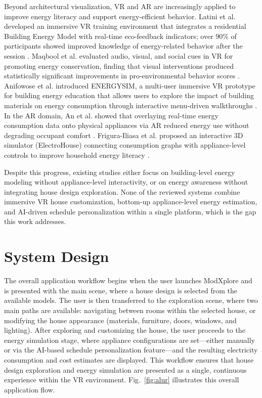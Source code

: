 \documentclass[conference]{IEEEtran}
\begin{document}
Beyond architectural visualization, VR and AR are increasingly applied to improve energy literacy and support energy-efficient behavior. Latini et al. developed an immersive VR training environment that integrates a residential Building Energy Model with real-time eco-feedback indicators; over 90\% of participants showed improved knowledge of energy-related behavior after the session \cite{EnergyAwarenessVR2025}. Maqbool et al. evaluated audio, visual, and social cues in VR for promoting energy conservation, finding that visual interventions produced statistically significant improvements in pro-environmental behavior scores \cite{maqbool2025vr}. Anifowose et al. introduced ENERGYSIM, a multi-user immersive VR prototype for building energy education that allows users to explore the impact of building materials on energy consumption through interactive menu-driven walkthroughs \cite{EnergySIM2023}. In the AR domain, An et al. showed that overlaying real-time energy consumption data onto physical appliances via AR reduced energy use without degrading occupant comfort \cite{AREnergy2023}. Frigura-Iliasa et al. proposed an interactive 3D simulator (ElectroHouse) connecting consumption graphs with appliance-level controls to improve household energy literacy \cite{electrohouse2023}.

Despite this progress, existing studies either focus on building-level energy modeling without appliance-level interactivity, or on energy awareness without integrating house design exploration. None of the reviewed systems combine immersive VR house customization, bottom-up appliance-level energy estimation, and AI-driven schedule personalization within a single platform, which is the gap this work addresses.


\section{System Design}

The overall application workflow begins when the user launches ModXplore and is presented with the main scene, where a house design is selected from the available models. The user is then transferred to the exploration scene, where two main paths are available: navigating between rooms within the selected house, or modifying the house appearance (materials, furniture, doors, windows, and lighting). After exploring and customizing the house, the user proceeds to the energy simulation stage, where appliance configurations are set—either manually or via the AI-based schedule personalization feature—and the resulting electricity consumption and cost estimates are displayed. This workflow ensures that house design exploration and energy simulation are presented as a single, continuous experience within the VR environment. Fig.~\ref{fig:alur} illustrates this overall application flow.
\end{document}
